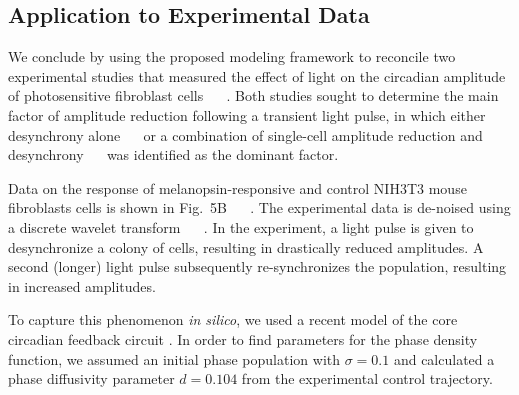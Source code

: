 \documentclass[11pt, letterpaper]{article}
\providecommand{\DIFadd}[1]{{\protect\color{blue}#1}} %
\providecommand{\DIFdel}[1]{{\protect\color{red}}}                      %
\providecommand{\DIFaddbegin}{} %
\providecommand{\DIFaddend}{} %
\providecommand{\DIFdelbegin}{} %
\providecommand{\DIFdelend}{} %
\begin{document}
\subsection*{Application to Experimental Data}
\DIFdelbegin \DIFdel{We finish by demonstrating how }\DIFdelend \DIFaddbegin 

\DIFadd{We conclude by using }\DIFaddend the proposed modeling framework \DIFdelbegin \DIFdel{is able to accurately reproduce bioluminescence experiments.
}\DIFdelend \DIFaddbegin \DIFadd{to reconcile two experimental studies that measured the effect of light on the circadian amplitude of photosensitive fibroblast cells \mbox{%
\cite{Ukai2007, Pulivarthy2007}
}%
.
Both studies sought to determine the main factor of amplitude reduction following a transient light pulse, in which either desynchrony alone \mbox{%
\cite{Ukai2007}
}%
or a combination of single-cell amplitude reduction and desynchrony \mbox{%
\cite{Pulivarthy2007}
}%
was identified as the dominant factor.
}

\DIFaddend Data on the response of melanopsin-responsive and control NIH3T3 mouse fibroblasts cells is shown in Fig.\DIFdelbegin \DIFdel{5A \mbox{%
\cite{Ukai2007}
}%
.
}\DIFdelend \DIFaddbegin \DIFadd{~5B \mbox{%
\cite{Ukai2007}
}%
.
The experimental data is de-noised using a discrete wavelet transform \mbox{%
\cite{Leise2011}
}%
.
}\DIFaddend In the experiment, a light pulse is given to desynchronize a colony of cells, resulting in drastically reduced amplitudes.
A second (longer) light pulse subsequently re-synchronizes the population, resulting in increased amplitudes.
\DIFdelbegin %

\DIFdelend To capture this phenomenon {\itshape in silico}, we used a recent model of the core circadian feedback circuit \cite{Hirota2012}.
\DIFdelbegin \DIFdel{We }\DIFdelend \DIFaddbegin \DIFadd{In order to find parameters for the phase density function, we }\DIFaddend assumed an initial phase population with $\sigma = 0.1$ and calculated a phase diffusivity parameter $d = 0.104$ from the experimental control trajectory.
\DIFdelbegin \DIFdel{From these
values, desynchronization ARCs revealed which parameters had the greatest
effect on population synchrony.
The }\DIFdelend \DIFaddbegin 
\end{document}
